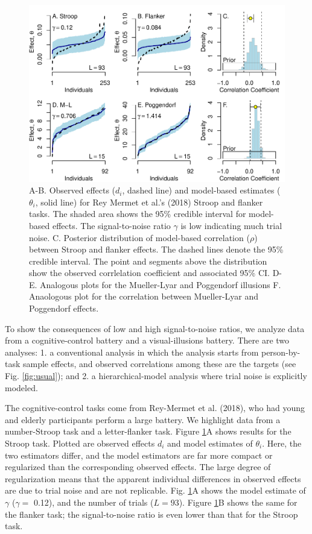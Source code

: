 \documentclass[
  ,man]{apa6}
\begin{document}
\begin{figure}
\centering
\includegraphics{p_files/figure-latex/reg-1.pdf}
\caption{\label{fig:reg}A-B. Observed effects (\(d_i\), dashed line) and model-based estimates (\(\theta_i\), solid line) for Rey Mermet et al.'s (2018) Stroop and flanker tasks. The shaded area shows the 95\% credible interval for model-based effects. The signal-to-noise ratio \(\gamma\) is low indicating much trial noise. C. Posterior distribution of model-based correlation (\(\rho\)) between Stroop and flanker effects. The dashed lines denote the 95\% credible interval. The point and segments above the distribution show the observed corrlelation coefficient and associated 95\% CI. D-E. Analogous plots for the Mueller-Lyar and Poggendorf illusions F. Anaologous plot for the correlation between Mueller-Lyar and Poggendorf effects.}
\end{figure}

To show the consequences of low and high signal-to-noise ratios, we analyze data from a cognitive-control battery and a visual-illusions battery. There are two analyses: 1. a conventional analysis in which the analysis starts from person-by-task sample effects, and observed correlations among these are the targets (see Fig. \ref{fig:usual}); and 2. a hierarchical-model analysis where trial noise is explicitly modeled.

The cognitive-control tasks come from Rey-Mermet et al. (2018), who had young and elderly participants perform a large battery. We highlight data from a number-Stroop task and a letter-flanker task. Figure \ref{fig:reg}A shows results for the Stroop task. Plotted are observed effects \(d_i\) and model estimates of \(\theta_i\). Here, the two estimators differ, and the model estimators are far more compact or regularized than the corresponding observed effects. The large degree of regularization means that the apparent individual differences in observed effects are due to trial noise and are not replicable. Fig. \ref{fig:reg}A shows the model estimate of \(\gamma\) (\(\hat{\gamma}=\)
0.12), and the number of trials (\(L=93\)). Figure \ref{fig:reg}B shows the same for the flanker task; the signal-to-noise ratio is even lower than that for the Stroop task.
\end{document}
